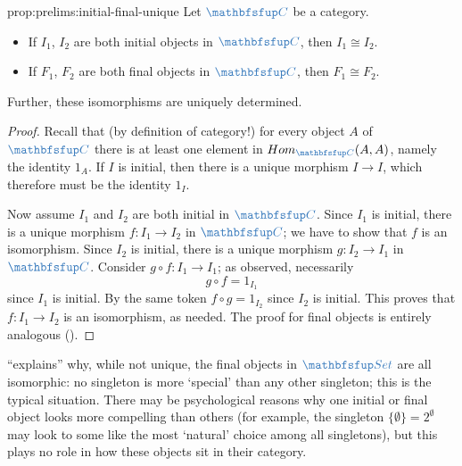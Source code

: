 \begin{prop}{}{prop:prelims:initial-final-unique}
  Let $\categ{C}$ be a category.
  \begin{itemize}
  \item If $I_1$, $I_2$ are both initial objects in $\categ{C}$, then
    $I_1 \cong I_2$.
  \item If $F_1$, $F_2$ are both final objects in $\categ{C}$, then
    $F_1 \cong F_2$.
  \end{itemize}
  Further, these isomorphisms are uniquely determined.
\end{prop}
\begin{proof}
  Recall that (by definition of category!) for every object $A$ of
  $\categ{C}$ there is at least one element in
  $\Hom_{\categ{C}}(A,A)$, namely the identity $1_A$. If $I$ is
  initial, then there is a unique morphism $I \to I$, which therefore
  must be the identity $1_I$.

  Now assume $I_1$ and $I_2$ are both initial in $\categ{C}$. Since
  $I_1$ is initial, there is a unique morphism $f \colon I_1 \to I_2$
  in $\categ{C}$; we have to show that $f$ is an isomorphism. Since
  $I_2$ is initial, there is a unique morphism $g \colon I_2 \to I_1$
  in $\categ{C}$. Consider $g \circ f \colon I_1 \to I_1$; as
  observed, necessarily
  \[
    g \circ f = 1_{I_1}
  \]
  since $I_1$ is initial. By the same token $f \circ g = 1_{I_2}$
  since $I_2$ is initial. This proves that $f \colon I_1 \to I_2$ is
  an isomorphism, as needed.  The proof for final objects is entirely
  analogous ().
\end{proof}

 ``explains'' why, while not
unique, the final objects in $\categ{Set}$ are all isomorphic: no
singleton is more `special' than any other singleton; this is the
typical situation. There may be psychological reasons why one initial
or final object looks more compelling than others (for example, the
singleton $\{\emptyset\} = 2^\emptyset$ may look to some like the most
`natural' choice among all singletons), but this plays no role in how
these objects sit in their category.

